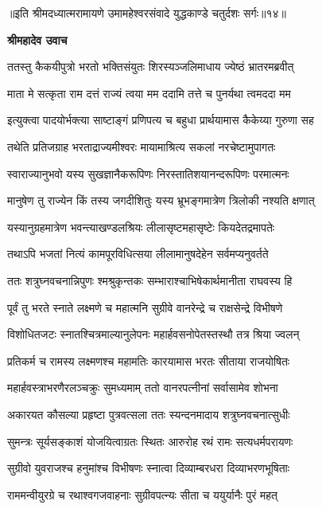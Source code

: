 {॥इति श्रीमदध्यात्मरामायणे उमामहेश्वरसंवादे युद्धकाण्डे
चतुर्दशः सर्गः॥१४॥
}




\textbf{श्रीमहादेव उवाच}

\twolineshloka
{ततस्तु कैकयीपुत्रो भरतो भक्तिसंयुतः}
{शिरस्यञ्जलिमाधाय ज्येष्ठं भ्रातरमब्रवीत्} %

\twolineshloka
{माता मे सत्कृता राम दत्तं राज्यं त्वया मम}
{ददामि तत्ते च पुनर्यथा त्वमददा मम} %

\twolineshloka
{इत्युक्त्वा पादयोर्भक्त्या साष्टाङ्गं प्रणिपत्य च}
{बहुधा प्रार्थयामास कैकेय्या गुरुणा सह} %

\twolineshloka
{तथेति प्रतिजग्राह भरताद्राज्यमीश्वरः}
{मायामाश्रित्य सकलां नरचेष्टामुपागतः} %

\twolineshloka
{स्वाराज्यानुभवो यस्य सुखज्ञानैकरूपिणः}
{निरस्तातिशयानन्दरूपिणः परमात्मनः} %

\twolineshloka
{मानुषेण तु राज्येन किं तस्य जगदीशितुः}
{यस्य भ्रूभङ्गमात्रेण त्रिलोकी नश्यति क्षणात्} %

\twolineshloka
{यस्यानुग्रहमात्रेण भवन्त्याखण्डलश्रियः}
{लीलासृष्टमहासृष्टेः कियदेतद्रमापतेः} %

\twolineshloka
{तथाऽपि भजतां नित्यं कामपूरविधित्सया}
{लीलामानुषदेहेन सर्वमप्यनुवर्तते} %

\twolineshloka
{ततः शत्रुघ्नवचनान्निपुणः श्मश्रुकृन्तकः}
{सम्भाराश्चाभिषेकार्थमानीता राघवस्य हि} %

\twolineshloka
{पूर्वं तु भरते स्नाते लक्ष्मणे च महात्मनि}
{सुग्रीवे वानरेन्द्रे च राक्षसेन्द्रे विभीषणे} %

\twolineshloka
{विशोधितजटः स्नातश्चित्रमाल्यानुलेपनः}
{महार्हवसनोपेतस्तस्थौ तत्र श्रिया ज्वलन्} %

\twolineshloka
{प्रतिकर्म च रामस्य लक्ष्मणश्च महामतिः}
{कारयामास भरतः सीताया राजयोषितः} %

\twolineshloka
{महार्हवस्त्राभरणैरलञ्चक्रुः सुमध्यमाम्}
{ततो वानरपत्नीनां सर्वासामेव शोभना} %

\twolineshloka
{अकारयत कौसल्या प्रहृष्टा पुत्रवत्सला}
{ततः स्यन्दनमादाय शत्रुघ्नवचनात्सुधीः} %

\twolineshloka
{सुमन्त्रः सूर्यसङ्काशं योजयित्वाग्रतः स्थितः}
{आरुरोह रथं रामः सत्यधर्मपरायणः} %

\twolineshloka
{सुग्रीवो युवराजश्च हनुमांश्च विभीषणः}
{स्नात्वा दिव्याम्बरधरा दिव्याभरणभूषिताः} %

\twolineshloka
{राममन्वीयुरग्रे च रथाश्वगजवाहनाः}
{सुग्रीवपत्न्यः सीता च ययुर्यानैः पुरं महत्} %

